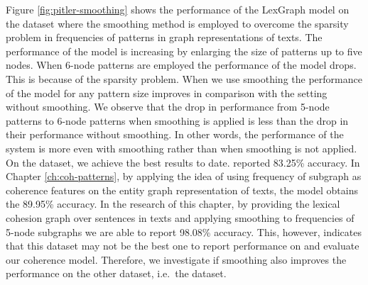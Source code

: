 Figure \ref{fig:pitler-smoothing} shows the performance of the LexGraph model on the \pitlerds dataset where the smoothing method is employed to overcome the sparsity problem in frequencies of patterns in graph representations of texts. 
The performance of the model is increasing by enlarging the size of patterns up to five nodes. 
When 6-node patterns are employed the performance of the model drops. 
This is because of the sparsity problem. 
When we use smoothing the performance of the model for any pattern size improves in comparison with the setting without smoothing.  
We observe that the drop in performance from 5-node patterns to 6-node patterns when smoothing is applied is less than the drop in their performance without smoothing.
In other words, the performance of the system is more even with smoothing rather than when smoothing is not applied. 
On the \pitlerds dataset, we achieve the best results to date.  
 reported 83.25\% accuracy. 
In Chapter \ref{ch:coh-patterns}, by applying the idea of using frequency of subgraph as coherence features on the entity graph representation of texts, the model obtains the 89.95\% accuracy. 
In the research of this chapter, by providing the lexical cohesion graph over sentences in texts and applying smoothing to frequencies of 5-node subgraphs we are able to report 98.08\% accuracy. 
This, however, indicates that this dataset may not be the best one to report performance on and evaluate our coherence model. 
Therefore, we investigate if smoothing also improves the performance on the other dataset, i.e.\ the \declercqds dataset.


